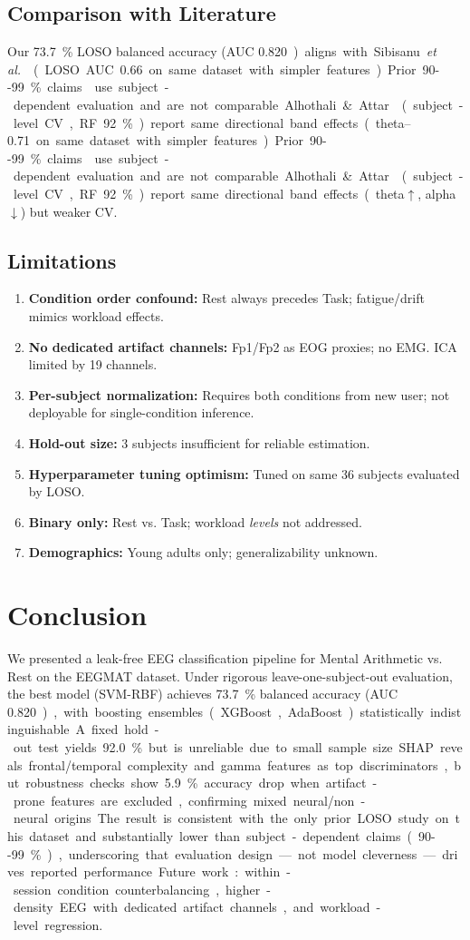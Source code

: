 \documentclass[conference]{IEEEtran}
\begin{document}
\subsection{Comparison with Literature}
Our \SI{73.7}{\%} LOSO balanced accuracy (AUC \SI{0.820}) aligns with Sibisanu \textit{et al.} \cite{sibisanu2026high} (LOSO AUC \SIrange{0.66}{0.71} on same dataset with simpler features). Prior \SI{90--99}{\%} claims \cite{nath2020eeg, rambhia2023classification, aslam2025electroencephalograph} use subject-dependent evaluation and are not comparable. Alhothali \& Attar \cite{alhothali2026validation} (subject-level CV, RF \SI{92}{\%}) report same directional band effects (theta$\uparrow$, alpha$\downarrow$) but weaker CV.

\subsection{Limitations}
\label{sec:limitations}
\begin{enumerate}
    \item \textbf{Condition order confound:} Rest always precedes Task; fatigue/drift mimics workload effects.
    \item \textbf{No dedicated artifact channels:} Fp1/Fp2 as EOG proxies; no EMG. ICA limited by \num{19} channels.
    \item \textbf{Per-subject normalization:} Requires both conditions from new user; not deployable for single-condition inference.
    \item \textbf{Hold-out size:} \num{3} subjects insufficient for reliable estimation.
    \item \textbf{Hyperparameter tuning optimism:} Tuned on same \num{36} subjects evaluated by LOSO.
    \item \textbf{Binary only:} Rest vs. Task; workload \textit{levels} not addressed.
    \item \textbf{Demographics:} Young adults only; generalizability unknown.
\end{enumerate}

\section{Conclusion}
We presented a leak-free EEG classification pipeline for Mental Arithmetic vs. Rest on the EEGMAT dataset. Under rigorous leave-one-subject-out evaluation, the best model (SVM-RBF) achieves \SI{73.7}{\%} balanced accuracy (AUC \SI{0.820}), with boosting ensembles (XGBoost, AdaBoost) statistically indistinguishable. A fixed hold-out test yields \SI{92.0}{\%} but is unreliable due to small sample size. SHAP reveals frontal/temporal complexity and gamma features as top discriminators, but robustness checks show \SI{5.9}{\%} accuracy drop when artifact-prone features are excluded, confirming mixed neural/non-neural origins. The result is consistent with the only prior LOSO study on this dataset and substantially lower than subject-dependent claims (\SI{90--99}{\%}), underscoring that evaluation design—not model cleverness—drives reported performance. Future work: within-session condition counterbalancing, higher-density EEG with dedicated artifact channels, and workload-level regression.
\end{document}

